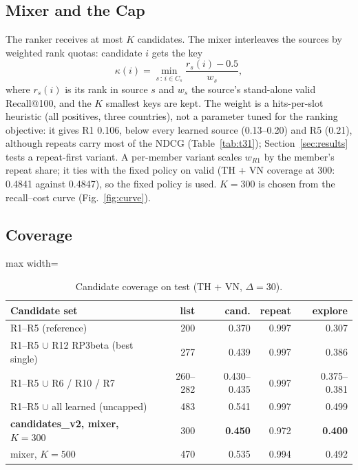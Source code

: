\documentclass{ieeeaccess}
\newcommand{\nK}{300}                %
\begin{document}
\subsection{Mixer and the Cap}
The ranker receives at most $K$ candidates. The mixer interleaves the sources by weighted rank quotas: candidate $i$ gets the key
\begin{equation}
\kappa(i) = \min_{s \,:\, i \in C_s} \frac{r_s(i) - 0.5}{w_s},
\end{equation}
where $r_s(i)$ is its rank in source $s$ and $w_s$ the source's stand-alone valid Recall@100, and the $K$ smallest keys are kept.
The weight is a hits-per-slot heuristic (all positives, three countries), not a parameter tuned for the ranking objective: it gives
R1 0.106, below every learned source (0.13--0.20) and R5 (0.21), although repeats carry most of the NDCG (Table~\ref{tab:t31}); Section~\ref{sec:results} tests a
repeat-first variant. A per-member variant scales $w_{R1}$ by the member's repeat share; it ties with the fixed policy on valid (TH + VN coverage at 300:
0.4841 against 0.4847), so the fixed policy is used. $K = \nK{}$ is chosen from the recall--cost curve (Fig.~\ref{fig:curve}).

\subsection{Coverage}

\begin{table}[t]
\caption{Candidate coverage on test (TH + VN, $\Delta = 30$).}
\label{tab:t30}
\setlength{\tabcolsep}{3pt}
\centering
\begin{adjustbox}{max width=\columnwidth}
\begin{tabular}{lrrrr}
\toprule
Candidate set & list & cand. & repeat & explore \\
\midrule
R1--R5 (reference)                       & 200     & 0.370 & 0.997 & 0.307 \\
R1--R5 $\cup$ R12 RP3beta (best single)  & 277     & 0.439 & 0.997 & 0.386 \\
R1--R5 $\cup$ R6 / R10 / R7              & 260--282 & 0.430--0.435 & 0.997 & 0.375--0.381 \\
R1--R5 $\cup$ all learned (uncapped)     & 483     & 0.541 & 0.997 & 0.499 \\
\textbf{candidates\_v2, mixer, $K = 300$} & 300    & \textbf{0.450} & 0.972 & \textbf{0.400} \\
mixer, $K = 500$                          & 470    & 0.535 & 0.994 & 0.492 \\
\bottomrule
\end{tabular}
\end{adjustbox}
\end{table}
\end{document}

